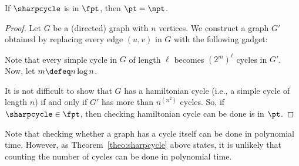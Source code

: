 \documentclass[11pt, a4paper]{article}
\begin{document}
\begin{theorem}
\label{theo:sharpcycle}
If $\sharpcycle$ is in $\fpt$, then $\pt=\npt$.
\end{theorem}
\begin{proof}
Let $G$ be a (directed) graph with $n$ vertices.
We construct a graph $G'$ obtained by replacing every edge $(u,v)$ in $G$
with the following gadget:
\begin{center}
\end{center}
Note that every simple cycle in $G$ of length $\ell$ becomes ${(2^m)}^\ell$ cycles in $G'$.
Now, let $m \defeq n\log n$.

It is not difficult to show that
$G$ has a hamiltonian cycle (i.e., a simple cycle of length $n$) if and only if $G'$ has more than $n^{(n^2)}$ cycles. 
So, if $\sharpcycle \in \fpt$, then checking hamiltonian cycle can be done is in $\pt$.
\end{proof}

Note that checking whether a graph has a cycle itself can be done in polynomial time.
However, as Theorem~\ref{theo:sharpcycle} above states,
it is unlikely that counting the number of cycles can be done in polynomial time.
\end{document}
